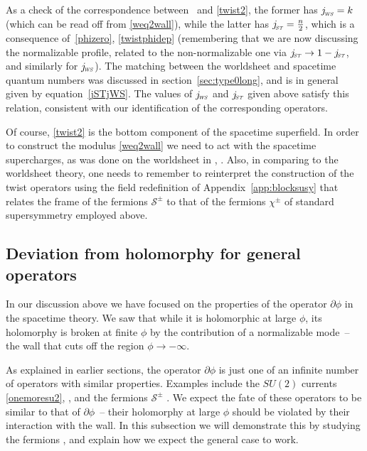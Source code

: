 \documentclass[12pt]{article}
\def\sutwo{{SU(2)}}
\def\ST{{\sst\it\! ST}}
\def\WS{{\sst\it\! WS}}
\numberwithin{equation}{section}
\def\cS{\mathcal {S}} \def\cT{\mathcal {T}} \def\cU{\mathcal {U}}
\def\sst{\scriptscriptstyle}
\begin{document}
As a check of the correspondence between \SSbar\ and \eqref{twist2}, the former has 
$j_\WS^{~}=k$ (which can be read off from \eqref{weq2wall}), while the latter has 
$j_\ST^{~}=\frac n2$, which is a consequence of~\eqref{phizero}, \eqref{twistphidep} (remembering that we are now discussing the normalizable profile, related to the non-normalizable one via $j_\ST\to 1-j_\ST$, and similarly for $j_\WS$). 
The matching between the worldsheet and spacetime quantum numbers was discussed in section~\ref{sec:type0long}, and is in general given by equation~\eqref{jSTjWS}. The values of $j_\WS$ and $j_\ST$ given above satisfy this relation, consistent with our identification of the corresponding operators.  

Of course, \eqref{twist2} is the bottom component of the spacetime superfield. In order to construct the modulus \eqref{weq2wall} we need to act with the spacetime supercharges, as was done on the worldsheet in \NSwall, \BPSsum.
Also, in comparing to the worldsheet theory, one needs to remember to reinterpret the construction of the twist operators using the field redefinition of Appendix~\ref{app:blocksusy} that relates the frame of the fermions $\cS^\pm$ to that of the fermions $\chi^\pm$ of standard supersymmetry employed above.


\subsection{Deviation from holomorphy for general operators}
\label{sec:genops}

In our discussion above we have focused on the properties of the operator $\partial\phi$ in the spacetime theory. We saw that while it is holomorphic at large $\phi$, its holomorphy is broken at finite $\phi$ by the contribution of a normalizable mode~-- the wall that cuts off the region $\phi\to-\infty$. 

As explained in earlier sections, the operator $\partial\phi$ is just one of an infinite number of operators with similar properties. Examples include the $\sutwo$ currents \eqref{onemoresu2}, \finalthird, and the fermions $\cS^\pm$ \blockferm. We expect the fate of these operators to be similar to that of $\partial\phi$~-- their holomorphy at large $\phi$ should be violated by their interaction with the wall. In this subsection we will demonstrate this by studying the fermions \blockferm, and explain how we expect the general case to work. 
\end{document}
